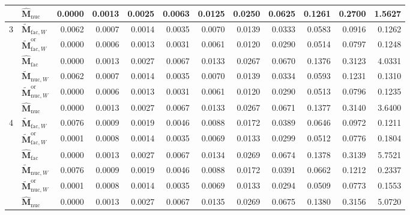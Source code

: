 \documentclass[numsec,webpdf,modern,large,namedate]{oup-authoring-template}
\theoremstyle{plain}
\theoremstyle{remark}
\newcommand{\M}{\bm{M}}
\begin{document}
\begin{table}[!htbp]
{\begin{tabular}{@{}llrrrrrrrrrr@{}}
 & $\widehat{\M}_{\mathrm{nuc}}$ & 0.0000 & 0.0013 & 0.0025 & 0.0063 & 0.0125 & 0.0250 & 0.0625 & 0.1261 & 0.2700 & 1.5627 \\
\midrule
\multirow{6}{*}{3} & $\widetilde{\M}_{\mathrm{fac},W}$ & 0.0062 & 0.0007 & 0.0014 & 0.0035 & 0.0070 & 0.0139 & 0.0333 & 0.0583 & 0.0916 & 0.1262 \\
 & $\widetilde{\M}_{\mathrm{fac},W}^{\mathrm{or}}$ & 0.0000 & 0.0006 & 0.0013 & 0.0031 & 0.0061 & 0.0120 & 0.0290 & 0.0514 & 0.0797 & 0.1248 \\
 & $\widehat{\M}_{\mathrm{fac}}$ & 0.0000 & 0.0013 & 0.0027 & 0.0067 & 0.0133 & 0.0267 & 0.0670 & 0.1376 & 0.3123 & 4.0331 \\
 & $\widetilde{\M}_{\mathrm{nuc},W}$ & 0.0062 & 0.0007 & 0.0014 & 0.0035 & 0.0070 & 0.0139 & 0.0334 & 0.0593 & 0.1231 & 0.1310 \\
 & $\widetilde{\M}_{\mathrm{nuc},W}^{\mathrm{or}}$ & 0.0000 & 0.0006 & 0.0013 & 0.0031 & 0.0061 & 0.0120 & 0.0290 & 0.0513 & 0.0796 & 0.1235 \\
 & $\widehat{\M}_{\mathrm{nuc}}$ & 0.0000 & 0.0013 & 0.0027 & 0.0067 & 0.0133 & 0.0267 & 0.0671 & 0.1377 & 0.3140 & 3.6400 \\
\midrule
\multirow{6}{*}{4} & $\widetilde{\M}_{\mathrm{fac},W}$ & 0.0076 & 0.0009 & 0.0019 & 0.0046 & 0.0088 & 0.0172 & 0.0389 & 0.0646 & 0.0972 & 0.1211 \\
 & $\widetilde{\M}_{\mathrm{fac},W}^{\mathrm{or}}$ & 0.0001 & 0.0008 & 0.0014 & 0.0035 & 0.0069 & 0.0133 & 0.0299 & 0.0512 & 0.0776 & 0.1804 \\
 & $\widehat{\M}_{\mathrm{fac}}$ & 0.0000 & 0.0013 & 0.0027 & 0.0067 & 0.0134 & 0.0269 & 0.0674 & 0.1378 & 0.3139 & 5.7521 \\
 & $\widetilde{\M}_{\mathrm{nuc},W}$ & 0.0076 & 0.0009 & 0.0019 & 0.0046 & 0.0088 & 0.0172 & 0.0391 & 0.0662 & 0.1212 & 0.2337 \\
 & $\widetilde{\M}_{\mathrm{nuc},W}^{\mathrm{or}}$ & 0.0001 & 0.0008 & 0.0014 & 0.0035 & 0.0069 & 0.0133 & 0.0294 & 0.0509 & 0.0773 & 0.1553 \\
 & $\widehat{\M}_{\mathrm{nuc}}$ & 0.0000 & 0.0013 & 0.0027 & 0.0067 & 0.0135 & 0.0269 & 0.0675 & 0.1380 & 0.3156 & 5.0720 \\
\bottomrule
\end{tabular}
}
\endgroup
\end{table}
\end{document}

